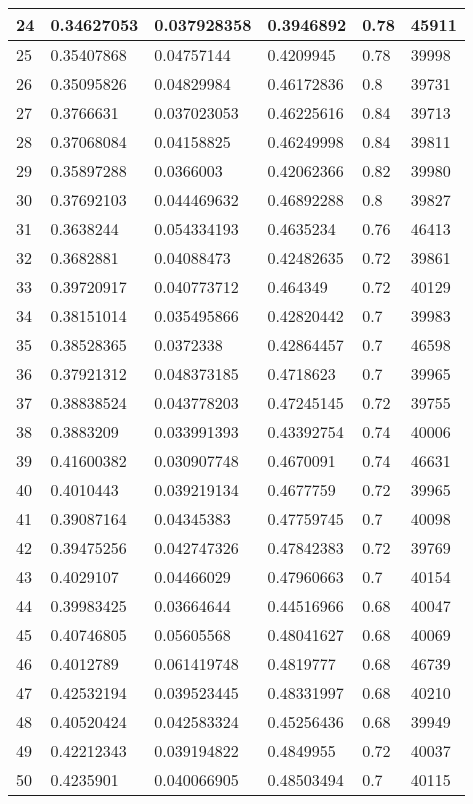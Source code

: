\begin{longtable}{|l|l|l|l|l|l|}
24 & 0.34627053 & 0.037928358 & 0.3946892 & 0.78 & 45911 \\ \hline 
25 & 0.35407868 & 0.04757144 & 0.4209945 & 0.78 & 39998 \\ \hline 
26 & 0.35095826 & 0.04829984 & 0.46172836 & 0.8 & 39731 \\ \hline 
27 & 0.3766631 & 0.037023053 & 0.46225616 & 0.84 & 39713 \\ \hline 
28 & 0.37068084 & 0.04158825 & 0.46249998 & 0.84 & 39811 \\ \hline 
29 & 0.35897288 & 0.0366003 & 0.42062366 & 0.82 & 39980 \\ \hline 
30 & 0.37692103 & 0.044469632 & 0.46892288 & 0.8 & 39827 \\ \hline 
31 & 0.3638244 & 0.054334193 & 0.4635234 & 0.76 & 46413 \\ \hline 
32 & 0.3682881 & 0.04088473 & 0.42482635 & 0.72 & 39861 \\ \hline 
33 & 0.39720917 & 0.040773712 & 0.464349 & 0.72 & 40129 \\ \hline 
34 & 0.38151014 & 0.035495866 & 0.42820442 & 0.7 & 39983 \\ \hline 
35 & 0.38528365 & 0.0372338 & 0.42864457 & 0.7 & 46598 \\ \hline 
36 & 0.37921312 & 0.048373185 & 0.4718623 & 0.7 & 39965 \\ \hline 
37 & 0.38838524 & 0.043778203 & 0.47245145 & 0.72 & 39755 \\ \hline 
38 & 0.3883209 & 0.033991393 & 0.43392754 & 0.74 & 40006 \\ \hline 
39 & 0.41600382 & 0.030907748 & 0.4670091 & 0.74 & 46631 \\ \hline 
40 & 0.4010443 & 0.039219134 & 0.4677759 & 0.72 & 39965 \\ \hline 
41 & 0.39087164 & 0.04345383 & 0.47759745 & 0.7 & 40098 \\ \hline 
42 & 0.39475256 & 0.042747326 & 0.47842383 & 0.72 & 39769 \\ \hline 
43 & 0.4029107 & 0.04466029 & 0.47960663 & 0.7 & 40154 \\ \hline 
44 & 0.39983425 & 0.03664644 & 0.44516966 & 0.68 & 40047 \\ \hline 
45 & 0.40746805 & 0.05605568 & 0.48041627 & 0.68 & 40069 \\ \hline 
46 & 0.4012789 & 0.061419748 & 0.4819777 & 0.68 & 46739 \\ \hline 
47 & 0.42532194 & 0.039523445 & 0.48331997 & 0.68 & 40210 \\ \hline 
48 & 0.40520424 & 0.042583324 & 0.45256436 & 0.68 & 39949 \\ \hline 
49 & 0.42212343 & 0.039194822 & 0.4849955 & 0.72 & 40037 \\ \hline 
50 & 0.4235901 & 0.040066905 & 0.48503494 & 0.7 & 40115 \\ \hline 
\end{longtable}